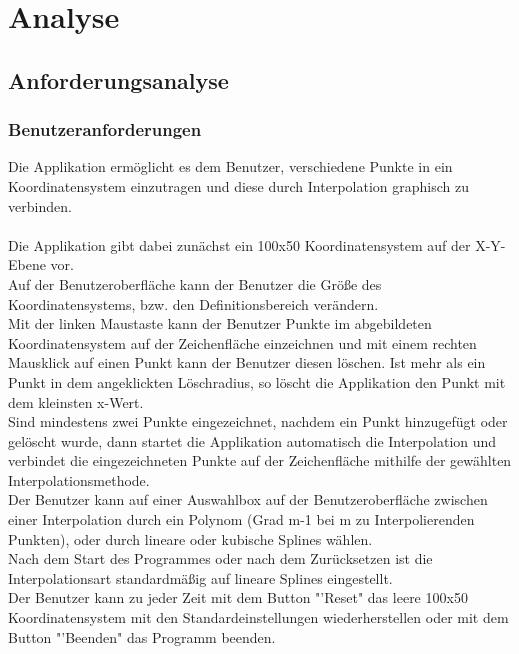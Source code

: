 \chapter{Analyse}
\label{ch:2}

\section{Anforderungsanalyse}
\label{sec:2.1}

\subsection{Benutzeranforderungen}
Die Applikation erm\"oglicht es dem Benutzer, verschiedene Punkte in ein Koordinatensystem einzutragen und diese durch Interpolation graphisch zu verbinden.\\
\\
Die Applikation gibt dabei zun\"achst ein 100x50 Koordinatensystem auf der X-Y-Ebene vor.\\
Auf der Benutzeroberfl\"ache kann der Benutzer die Gr\"o\ss e des Koordinatensystems, bzw. den Definitionsbereich ver\"andern.\\
Mit der linken Maustaste kann der Benutzer Punkte im abgebildeten Koordinatensystem auf der Zeichenfl\"ache einzeichnen und mit einem rechten Mausklick auf einen Punkt kann der Benutzer diesen l\"oschen.
Ist mehr als ein Punkt in dem angeklickten L\"oschradius, so l\"oscht die Applikation den Punkt mit dem kleinsten x-Wert.\\
Sind mindestens zwei Punkte eingezeichnet, nachdem ein Punkt hinzugef\"ugt oder gel\"oscht wurde, dann startet die Applikation automatisch die Interpolation und verbindet die eingezeichneten Punkte auf der Zeichenfl\"ache mithilfe der gew\"ahlten Interpolationsmethode.\\
Der Benutzer kann auf einer Auswahlbox auf der Benutzeroberfl\"ache zwischen einer Interpolation durch ein Polynom (Grad m-1 bei m zu Interpolierenden Punkten), oder durch lineare oder kubische Splines w\"ahlen.\\
Nach dem Start des Programmes oder nach dem Zur\"ucksetzen ist die Interpolationsart standardm\"a\ss ig auf lineare Splines eingestellt.\\
Der Benutzer kann zu jeder Zeit  mit dem Button "'Reset"  das leere 100x50 Koordinatensystem mit den Standardeinstellungen wiederherstellen oder mit dem Button "'Beenden" das Programm beenden. \\
\\
